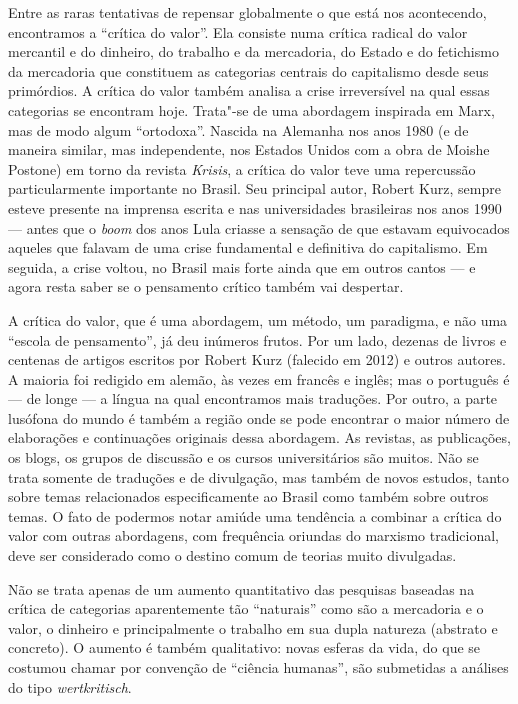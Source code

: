 Entre as raras tentativas de repensar globalmente o que está nos
acontecendo, encontramos a ``crítica do valor''. Ela consiste numa
crítica radical do valor mercantil e do dinheiro, do trabalho e da
mercadoria, do Estado e do fetichismo da mercadoria que constituem as
categorias centrais do capitalismo desde seus primórdios. A crítica do
valor também analisa a crise irreversível na qual essas categorias se
encontram hoje. Trata"-se de uma abordagem inspirada em Marx, mas de modo
algum ``ortodoxa''. Nascida na Alemanha nos anos 1980 (e de maneira
similar, mas independente, nos Estados Unidos com a obra de Moishe
Postone) em torno da revista \emph{Krisis}, a crítica do valor teve uma
repercussão particularmente importante no Brasil. Seu principal autor,
Robert Kurz, sempre esteve presente na imprensa escrita e nas universidades
brasileiras nos anos 1990 --- antes que o \emph{boom} dos anos Lula
criasse a sensação de que estavam equivocados aqueles que falavam de uma
crise fundamental e definitiva do capitalismo. Em seguida, a crise
voltou, no Brasil mais forte ainda que em outros cantos --- e agora resta
saber se o pensamento crítico também vai despertar.

A crítica do valor, que é uma abordagem, um método, um paradigma, e não
uma ``escola de pensamento'', já deu inúmeros frutos. Por um lado,
dezenas de livros e centenas de artigos escritos por Robert Kurz
(falecido em 2012) e outros autores. A maioria foi redigido em alemão,
às vezes em francês e inglês; mas o português é --- de longe --- a língua
na qual encontramos mais traduções. Por outro, a parte lusófona do mundo
é também a região onde se pode encontrar o maior número de elaborações
e continuações originais dessa abordagem. As revistas, as publicações,
os blogs, os grupos de discussão e os cursos universitários são muitos.
Não se trata somente de traduções e de divulgação, mas também de novos
estudos, tanto sobre temas relacionados especificamente ao Brasil como
também sobre outros temas. O fato de podermos notar amiúde uma tendência
a combinar a crítica do valor com outras abordagens, com frequência
oriundas do marxismo tradicional, deve ser considerado como o destino
comum de teorias muito divulgadas.

Não se trata apenas de um aumento quantitativo das pesquisas baseadas na
crítica de categorias aparentemente tão ``naturais'' como são a
mercadoria e o valor, o dinheiro e principalmente o trabalho em sua
dupla natureza (abstrato e concreto). O aumento é também qualitativo:
novas esferas da vida, do que se costumou chamar por convenção de
``ciência humanas'', são submetidas a análises do tipo
\emph{wertkritisch}.

